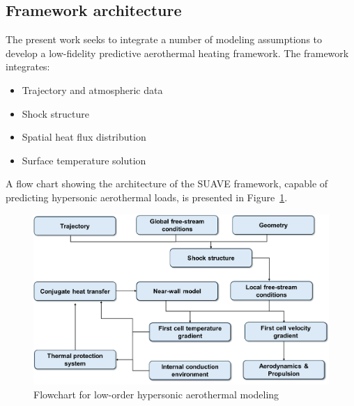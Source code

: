 \documentclass[%
 aip,
 amsmath,amssymb,
preprint,%
]{revtex4-1}
\begin{document}
\subsection{Framework architecture}
The present work seeks to integrate a number of modeling assumptions to develop a low-fidelity predictive aerothermal heating framework. The framework integrates:
\begin{itemize}
    \setlength\itemsep{0.1em}
    \item Trajectory and atmospheric data
    \item Shock structure
    \item Spatial heat flux distribution
    \item Surface temperature solution
\end{itemize}

 A flow chart showing the architecture of the SUAVE framework, capable of predicting hypersonic aerothermal loads, is presented in Figure~\ref{fig:1}. %



\begin{figure}
\centering
\includegraphics[width=1\linewidth]{flowchart.png}
\caption{Flowchart for low-order hypersonic aerothermal modeling}
\label{fig:1}
\end{figure}
\end{document}
